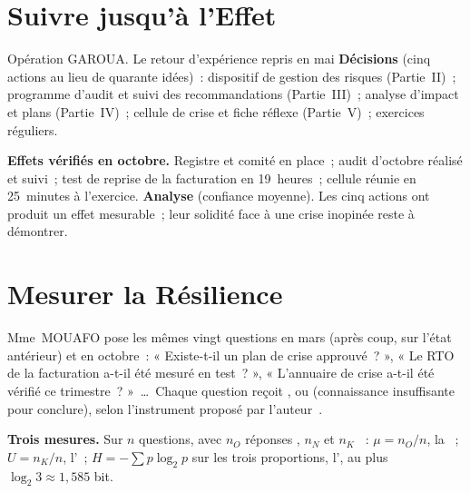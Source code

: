 \section{Suivre jusqu'à l'Effet}
\label{sec:c26-suivre}

\begin{boxscenario}{Opération GAROUA. Le retour d'expérience repris en mai}
\textbf{Décisions} (cinq actions au lieu de quarante idées)~: dispositif
de gestion des risques (Partie~II)~; programme d'audit et suivi des
recommandations (Partie~III)~; analyse d'impact et plans (Partie~IV)~;
cellule de crise et fiche réflexe (Partie~V)~; exercices réguliers.

\medskip
\textbf{Effets vérifiés en octobre.} Registre et comité en place~; audit
d'octobre réalisé et suivi~; test de reprise de la facturation en
19~heures~; cellule réunie en 25~minutes à l'exercice. \textbf{Analyse}
(confiance moyenne). Les cinq actions ont produit un effet mesurable~;
leur solidité face à une crise inopinée reste à démontrer.
\end{boxscenario}

\section{Mesurer la Résilience}
\label{sec:c26-mesurer}

Mme~MOUAFO pose les mêmes vingt questions en mars (après coup, sur
l'état antérieur) et en octobre~: « Existe-t-il un plan de crise
approuvé~? », « Le RTO de la facturation a-t-il été mesuré en test~? »,
« L'annuaire de crise a-t-il été vérifié ce trimestre~? »~\ldots~Chaque
question reçoit \OUI{}, \NON{} ou \NEK{} (connaissance insuffisante pour
conclure), selon l'instrument proposé par l'auteur~\cite{minka2026nek}.

\begin{boxdef}
\textbf{Trois mesures.} Sur $n$ questions, avec $n_O$ réponses \OUI{},
$n_N$ \NON{} et $n_K$ \NEK{}~: $\mu = n_O / n$, la ~;
$U = n_K / n$, l'~; $H = -\sum p \log_2 p$ sur les
trois proportions, l', au plus $\log_2 3 \approx 1{,}585$
bit.
\end{boxdef}


